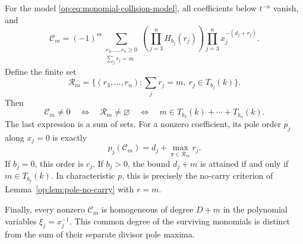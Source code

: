 \begin{theorem}
\label{op:thm:monomial-pole-support}
For the model \eqref{op:eq:monomial-collision-model}, all coefficients
below \(t^{-a}\) vanish, and
\begin{equation}\label{op:eq:exact-monomial-coefficient}
 \mathcal C_m=(-1)^m
 \sum_{\substack{r_3,\ldots,r_n\ge0\\\sum_jr_j=m}}
 \left(\prod_{j=3}^nH_{b_j}(r_j)\right)
 \prod_{j=3}^nx_j^{-(d_j+r_j)}.
\end{equation}
Define the finite set
\[
 \mathcal R_m=
 \{(r_3,\ldots,r_n):\textstyle\sum_jr_j=m,
                    \ r_j\in T_{b_j}(k)\}.
\]
Then
\begin{equation}\label{op:eq:exact-coefficient-support}
 \mathcal C_m\ne0
 \quad\Longleftrightarrow\quad
 \mathcal R_m\ne\varnothing
 \quad\Longleftrightarrow\quad
 m\in T_{b_3}(k)+\cdots+T_{b_n}(k).
\end{equation}
The last expression is a sum of sets.
For a nonzero coefficient, its pole order \(p_j\) along
\(x_j=0\) is exactly
\begin{equation}\label{op:eq:exact-divisorial-pole}
 p_j(\mathcal C_m)=d_j+\max_{\mathbf r\in\mathcal R_m}r_j.
\end{equation}
If \(b_j=0\), this order is \(c_j\).
If \(b_j>0\), the bound \(d_j+m\) is attained if and
only if \(m\in T_{b_j}(k)\).  In characteristic \(p\),
this is precisely the no-carry criterion of
Lemma~\ref{op:lem:pole-no-carry} with \(r=m\).

Finally, every nonzero \(\mathcal C_m\) is homogeneous of degree
\(D+m\) in the polynomial variables \(\xi_j=x_j^{-1}\).
This common degree of the surviving monomials is distinct from
the sum of their separate divisor pole maxima.
\end{theorem}

